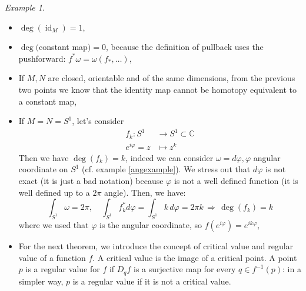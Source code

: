 \documentclass[a4paper,11pt,titlepage, article, oneside]{memoir}
\numberwithin{equation}{section}
\theoremstyle{definition}
\theoremstyle{remark}
\newtheorem{example}[theorem]{Example}
\DeclareMathOperator{\id}{id}
\begin{document}
\begin{tcolorbox}
\begin{example} \label{degreeexample}
$ $
\begin{itemize}
\item $\deg(\id_M) = 1$,
\item $\deg($constant map$)=0$, because the definition of pullback uses the pushforward: $f^* \omega = \omega (f_*, \ldots)$,
\item If $M, N$ are closed, orientable and of the same dimensions, from the previous two points we know that the identity map cannot be homotopy equivalent to a constant map,
\item If $M=N=S^1$, let's consider
\begin{align*}
f_k \colon S^1 &\rightarrow S^1 \subset \mathbb{C} \\
e^{i \varphi} = z &\mapsto z^k
\end{align*}
Then we have $\deg(f_k) = k$, indeed we can consider $\omega = d\varphi, \varphi$ angular coordinate on $S^1$ (cf. example \ref{angexample}). We stress out that $d\varphi$ is not exact (it is just a bad notation) because $\varphi$ is not a well defined function (it is well defined up to a $2\pi$ angle). Then, we have:
$$\int_{S^1} \omega = 2\pi, \quad \int_{S^1} f_k^* d\varphi = \int_{S^1} k \,d\varphi = 2\pi k \, \Rightarrow \,  \deg(f_k)=k$$
where we used that $\varphi$ is the angular coordinate, so $f(e^{i\varphi}) = e^{i k \varphi}$,
\item For the next theorem, we introduce the concept of critical value and regular value of a function $f$. A critical value is the image of a critical point. A point $p$ is a regular value for $f$ if $D_q f$ is a surjective map for every $q \in f^{-1}(p)$: in a simpler way, $p$ is a regular value if it is not a critical value.
\end{itemize}
\end{example}
\end{tcolorbox}
\end{document}
